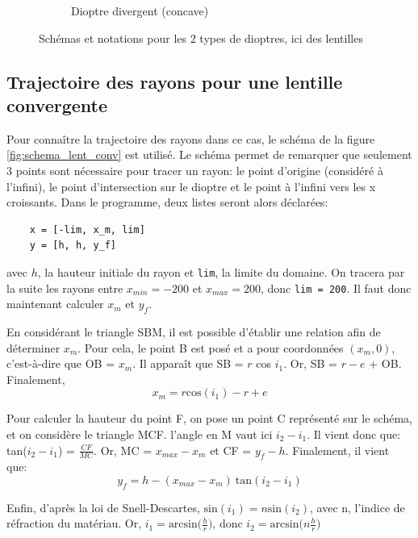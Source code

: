 \documentclass[a4paper, 11pt]{article}
\begin{document}
\begin{figure}[H]
\begin{subfigure}[t]{0.45\linewidth}
		\caption{Dioptre divergent (concave)}
		\label{fig:schema_lent_div} 
    \end{subfigure}

    \caption{Schémas et notations pour les 2 types de dioptres, ici des lentilles}\label{fig:schema_lentilles}
\end{figure}

\subsection{Trajectoire des rayons pour une lentille convergente}
Pour connaître la trajectoire des rayons dans ce cas, le schéma de la figure \ref{fig:schema_lent_conv} est utilisé. Le schéma permet de remarquer que seulement 3 points sont nécessaire pour tracer un rayon: le point d'origine (considéré à l'infini), le point d'intersection sur le dioptre et le point à l'infini vers les x croissants. Dans le programme, deux listes seront alors déclarées:
\begin{verbatim}
	x = [-lim, x_m, lim]
	y = [h, h, y_f]
\end{verbatim}
avec $h$, la hauteur initiale du rayon et \verb|lim|, la limite du domaine. On tracera par la suite les rayons entre $x_{min} = -200$ et $x_{max} = 200$, donc \verb|lim = 200|. Il faut donc maintenant calculer $x_m$ et $y_f$.


En considérant le triangle SBM, il est possible d'établir une relation afin de déterminer $x_m$. Pour cela, le point B est posé et a pour coordonnées $(x_m, 0)$, c'est-à-dire que OB = $x_m$. Il apparaît que SB = $r$ cos $i_1$. Or, SB = $r - e$ + OB. 
Finalement, 
\begin{equation*}
	x_m = r \text{cos}(i_1) - r + e
\end{equation*}

Pour calculer la hauteur du point F, on pose un point C représenté sur le schéma, et on considère le triangle MCF. l'angle en M vaut ici $i_2 - i_1$. Il vient donc que: tan($i_2 - i_1$) = $\frac{CF}{MC}$. Or, MC = $x_{max} - x_m$ et CF = $y_f - h$. Finalement, il vient que:
\begin{equation*}
	y_f = h - (x_{max} - x_m) \: \text{tan} (i_2 - i_1)
\end{equation*}


Enfin, d'après la loi de Snell-Descartes, $\text{sin}(i_1) = n \text{sin}(i_2)$, avec n, l'indice de réfraction du matériau. Or, $i_1 = \text{arcsin}\big( \frac{h}{r}\big)$, donc $i_2 = \text{arcsin}\big( n \frac{h}{r}\big)$
\end{document}
